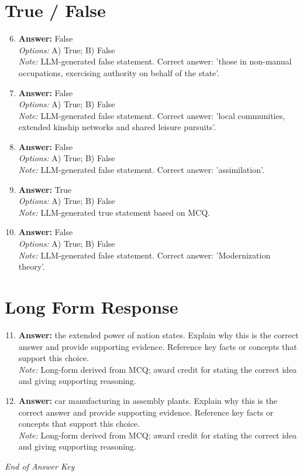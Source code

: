 \documentclass[12pt]{article}
\begin{document}
\section*{True / False}
\begin{enumerate}[label=\arabic*.]
\setcounter{enumi}{5}
\item \textbf{Answer:} False
\\ \textit{Options:} A) True; B) False
\\ \textit{Note:} LLM-generated false statement. Correct answer: 'those in non-manual occupations, exercising authority on behalf of the state'.
\item \textbf{Answer:} False
\\ \textit{Options:} A) True; B) False
\\ \textit{Note:} LLM-generated false statement. Correct answer: 'local communities, extended kinship networks and shared leisure pursuits'.
\item \textbf{Answer:} False
\\ \textit{Options:} A) True; B) False
\\ \textit{Note:} LLM-generated false statement. Correct answer: 'assimilation'.
\item \textbf{Answer:} True
\\ \textit{Options:} A) True; B) False
\\ \textit{Note:} LLM-generated true statement based on MCQ.
\item \textbf{Answer:} False
\\ \textit{Options:} A) True; B) False
\\ \textit{Note:} LLM-generated false statement. Correct answer: 'Modernization theory'.
\end{enumerate}

\section*{Long Form Response}
\begin{enumerate}[label=\arabic*.]
\setcounter{enumi}{10}
\item \textbf{Answer:} the extended power of nation states. Explain why this is the correct answer and provide supporting evidence. Reference key facts or concepts that support this choice.
\\ \textit{Note:} Long-form derived from MCQ; award credit for stating the correct idea and giving supporting reasoning.
\item \textbf{Answer:} car manufacturing in assembly plants. Explain why this is the correct answer and provide supporting evidence. Reference key facts or concepts that support this choice.
\\ \textit{Note:} Long-form derived from MCQ; award credit for stating the correct idea and giving supporting reasoning.
\end{enumerate}

\vfill
\noindent\textit{End of Answer Key}
\end{document}
